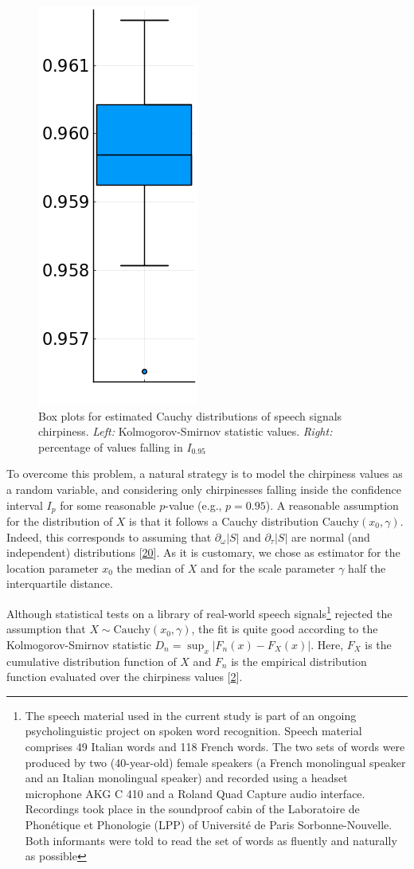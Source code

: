 \documentclass[american,]{article}
\theoremstyle{definition}
\theoremstyle{definition}
\theoremstyle{definition}
\theoremstyle{remark}
\begin{document}
\begin{figure}[H]
\begin{minipage}{.47\linewidth}
        \includegraphics[width=.27\textwidth]{img/cauchy_values_percentage_iqr_2.png}
    \caption{Box plots for estimated Cauchy distributions of speech signals chirpiness.
    \emph{Left:} Kolmogorov-Smirnov statistic values.
    \emph{Right:} percentage of values falling in $I_{0.95}$}
    \end{minipage}
\end{figure}

To overcome this problem, a natural strategy is to model the chirpiness values as
a random variable, and considering only chirpinesses falling inside the confidence
interval \(I_p\) for some reasonable \(p\)-value (e.g., \(p=0.95\)).
A reasonable assumption for the distribution of \(X\) is that it follows
a Cauchy distribution \(\mathrm{Cauchy}(x_0, \gamma)\).
Indeed, this corresponds to assuming that \(\partial_\omega\left\lvert S\right\rvert\) and
\(\partial_\tau\left\lvert S\right\rvert\) are normal (and independent) distributions {[}\protect\hyperlink{ref-papoulis1991}{20}{]}.
As it is customary, we chose as estimator for the location parameter \(x_0\) the median of \(X\)
and for the scale parameter \(\gamma\) half the interquartile distance.

Although statistical tests on a library of real-world speech signals\footnote{The speech material used in the current study is part of an ongoing
  psycholinguistic project on spoken word recognition.
  Speech material comprises 49 Italian words and 118 French words.
  The two sets of words were produced by two (40-year-old) female speakers
  (a French monolingual speaker and an Italian monolingual speaker) and recorded
  using a headset microphone AKG C 410 and a Roland Quad Capture audio interface.
  Recordings took place in the soundproof cabin of the Laboratoire de Phonétique
  et Phonologie (LPP) of Université de Paris Sorbonne-Nouvelle.
  Both informants were told to read the set of words as fluently and naturally as possible}
rejected the assumption that \(X\sim \mathrm{Cauchy}(x_0,\gamma)\),
the fit is quite good according to the Kolmogorov-Smirnov statistic
\(D_n=\sup_x\left\lvert F_n(x)-F_X(x)\right\rvert\). Here, \(F_X\) is the cumulative distribution function
of \(X\) and \(F_n\) is the empirical distribution function
evaluated over the chirpiness values {[}\protect\hyperlink{ref-asswad2021}{2}{]}.
\end{document}
